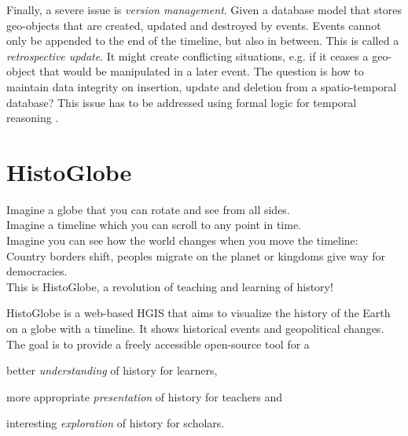 Finally, a severe issue is \emph{version management}. Given a database model that stores geo-objects that are created, updated and destroyed by events. Events cannot only be appended to the end of the timeline, but also in between. This is called a \emph{retrospective update}. It might create conflicting situations, e.g. if it ceases a geo-object that would be manipulated in a later event. The question is how to maintain data integrity on insertion, update and deletion from a spatio-temporal database? This issue has to be addressed using formal logic for temporal reasoning
\cite[section 6]{peuquet99}.




\section{HistoGlobe} %
\label{sec:histoglobe}

\begin{quoteit}
  Imagine a globe that you can rotate and see from all sides. \\
  Imagine a timeline which you can scroll to any point in time. \\
  Imagine you can see how the world changes when you move the timeline: \\
  Country borders shift, peoples migrate on the planet or kingdoms give way for democracies. \\[0.5em]
  This is HistoGlobe, a revolution of teaching and learning of history!
\end{quoteit}

HistoGlobe is a web-based HGIS that aims to visualize the history of the Earth on a globe with a timeline. It shows historical events and geopolitical changes. The goal is to provide a freely accessible open-source tool for a

\begin{compactitem}
  \item better \emph{understanding} of history for learners,
  \item more appropriate \emph{presentation} of history for teachers and
  \item interesting \emph{exploration} of history for scholars.
\end{compactitem}

